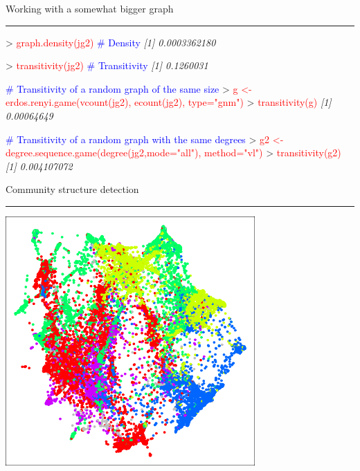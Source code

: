 \documentclass[landscape]{foils}
\newcommand{\stitle}[1]{{\centering\color{blue}\Large #1\par\vspace*{10pt}\hrule}}
\newcommand{\command}[1]{\textcolor{red}{#1}}
\newcommand{\comment}[1]{\textcolor{blue}{#1}}
\begin{document}
\newpage
\stitle{Working with a somewhat bigger graph}
\begin{Myverb}
> \command{graph.density(jg2)}\comment{                        # Density}
\slshape [1] 0.0003362180\pause

> \command{transitivity(jg2)}\comment{                         # Transitivity}
\slshape [1] 0.1260031\pause

\comment{# Transitivity of a random graph of the same size}
> \command{g <- erdos.renyi.game(vcount(jg2), ecount(jg2), type="gnm")}
> \command{transitivity(g)}
\slshape [1] 0.00064649\pause

\comment{# Transitivity of a random graph with the same degrees}
> \command{g2 <- degree.sequence.game(degree(jg2,mode="all"), method="vl")}
> \command{transitivity(g2)}
\slshape [1] 0.004107072
\end{Myverb}

\newpage
\stitle{Community structure detection}
\begin{flushright}
\vspace*{-9.5cm}
\includegraphics{jgplot}
\end{flushright}
\end{document}

